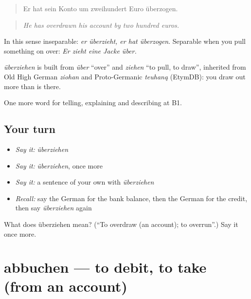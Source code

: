 \begin{quote}
Er hat sein Konto um zweihundert Euro überzogen.
\end{quote}

\begin{quote}
\emph{He has overdrawn his account by two hundred euros.}
\end{quote}

In this sense inseparable: \emph{er überzieht, er hat überzogen}. Separable when you pull something on over: \emph{Er zieht eine Jacke über.}

\begin{cousinweb}
\emph{überziehen} is built from \emph{über} \textquotedblleft{}over\textquotedblright{} and \emph{ziehen} \textquotedblleft{}to pull, to draw\textquotedblright{}, inherited from Old High German \emph{ziohan} and Proto-Germanic \emph{teuhaną} (EtymDB): you draw out more than is there.
\end{cousinweb}

\begin{grammarlens}[title={What you've built}]
One more word for telling, explaining and describing at B1.
\end{grammarlens}

\subsection*{Your turn}
\begin{itemize}
\raggedright
  \item \emph{Say it:} \emph{überziehen}
  \item \emph{Say it:} \emph{überziehen}, once more
  \item \emph{Say it:} a sentence of your own with \emph{überziehen}
  \item \emph{Recall:} say the German for the bank balance, then the German for the credit, then say \emph{überziehen} again
\end{itemize}

\begin{tcolorbox}[breakable,colback=teal!4,colframe=teal!35!black,title={Before you move on}]
What does überziehen mean? (\textquotedblleft{}To overdraw (an account); to overrun\textquotedblright{}.) Say it once more.
\end{tcolorbox}
\section[abbuchen]{abbuchen — to debit, to take (from an account)}

